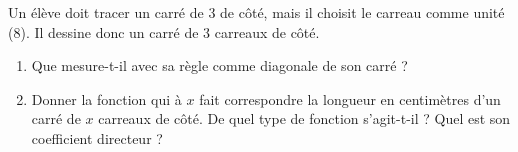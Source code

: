 
\begin{exercice}\label{exosmath-0506}

    Un élève doit tracer un carré de \unit{3}{\centi\meter} de côté, mais il choisit le carreau comme unité (\unit{8}{\milli\meter}). Il dessine donc un carré de \( 3\) carreaux de côté.
    \begin{enumerate}
        \item
            Que mesure-t-il avec sa règle comme diagonale de son carré ?
        \item
            Donner la fonction qui à \( x\) fait correspondre la longueur en centimètres d'un carré de \( x\) carreaux de côté. De quel type de fonction s'agit-t-il ? Quel est son coefficient directeur ?
    \end{enumerate}

\end{exercice}
